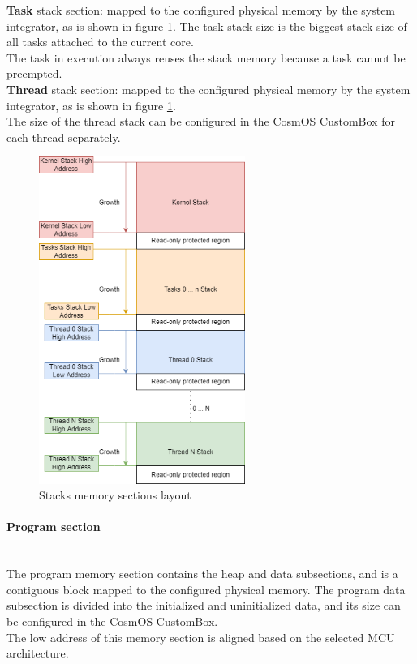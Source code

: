 \textbf{Task} stack section: mapped to the configured physical memory by the system integrator, as is shown in figure \ref{fig:StacksMapping}. The task stack size is the biggest stack size of all tasks attached to the current core.\\
\indent The task in execution always reuses the stack memory because a task cannot be preempted.\\

\textbf{Thread} stack section: mapped to the configured physical memory by the system integrator, as is shown in figure \ref{fig:StacksMapping}.\\
\indent The size of the thread stack can be configured in the CosmOS CustomBox for each thread separately.

\begin{figure}[H]
\begin{center}
\includegraphics[width=0.6\textwidth]{images/stacks_mapping.png}
\caption{Stacks memory sections layout}
\label{fig:StacksMapping}
\end{center}
\end{figure}

\paragraph{Program section}\label{programMemorySection}\mbox{}\\
\indent The program memory section contains the heap and data subsections, and is a contiguous block mapped to the configured physical memory. The program data subsection is divided into the initialized and uninitialized data, and its size can be configured in the CosmOS CustomBox.\\
\indent The low address of this memory section is aligned based on the selected \ac{MCU} architecture. \\

